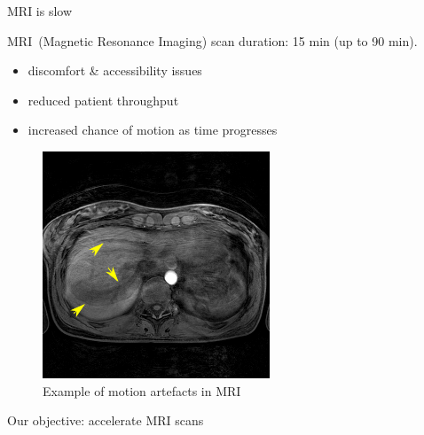 \documentclass[aspectratio=169,xcolor=dvipsnames]{beamer}
\begin{document}
\begin{frame}{MRI is slow}
    \begin{multicols}{2}
        MRI~(Magnetic Resonance Imaging) scan duration: 15 min (up to 90 min).
    \begin{itemize}
        \item discomfort \& accessibility issues
        \item reduced patient throughput
        \item increased chance of motion as time progresses
    \end{itemize}
    \newpage
    \begin{figure}
        \centering
        \includegraphics[height=0.5\textheight]{Figures/intro_figures/motion_mri.png}
        \caption{Example of motion artefacts in MRI}
    \end{figure}
    \end{multicols}
    
\end{frame}

\begin{frame}{Our objective: accelerate MRI scans}
    \setlength{\parskip}{1ex}
    \begin{multicols}{2}
    \tableofcontents
    \end{multicols}
\end{frame}




\end{document}
